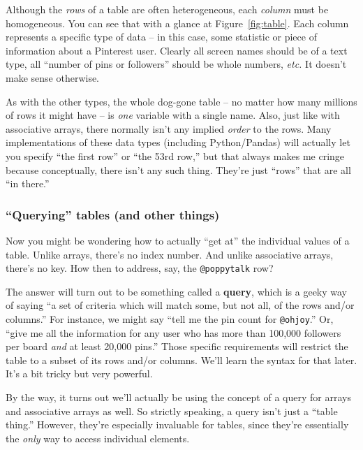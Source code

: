 Although the \textit{rows} of a table are often heterogeneous, each
\textit{column} must be homogeneous. You can see that with a glance at
Figure~\ref{fig:table}. Each column represents a specific type of data -- in
this case, some statistic or piece of information about a Pinterest user.
Clearly all screen names should be of a text type, all ``number of pins or
followers'' should be whole numbers, \textit{etc.} It doesn't make sense
otherwise.

\label{assocArraysUnordered}
As with the other types, the whole dog-gone table -- no matter how many
millions of rows it might have -- is \textit{one} variable with a single name.
Also, just like with associative arrays, there normally isn't any implied
\textit{order} to the rows. Many implementations of these data types (including
Python/Pandas) will actually let you specify ``the first row'' or ``the
53rd row,'' but that always makes me cringe because conceptually,
there isn't any such thing. They're just ``rows'' that are all ``in
there.''

\subsubsection{``Querying'' tables (and other things)}

\label{tablesHaveNoKey}

Now you might be wondering how to actually ``get at'' the individual values of
a table. Unlike arrays, there's no index number. And unlike associative arrays,
there's no key. How then to address, say, the \texttt{@poppytalk} row?

The answer will turn out to be something called a \textbf{query}, which is a
geeky way of saying ``a set of criteria which will match some, but not all, of
the rows and/or columns.'' For instance, we might say ``tell me the pin count
for \texttt{@ohjoy}.'' Or, ``give me all the information for any user who has
more than 100,000 followers per board \textit{and} at least 20,000 pins.''
Those specific requirements will restrict the table to a subset of its rows
and/or columns. We'll learn the syntax for that later. It's a bit tricky but
very powerful.

By the way, it turns out we'll actually be using the concept of a query for
arrays and associative arrays as well. So strictly speaking, a query isn't just
a ``table thing.'' However, they're especially invaluable for tables, since
they're essentially the \textit{only} way to access individual elements.

